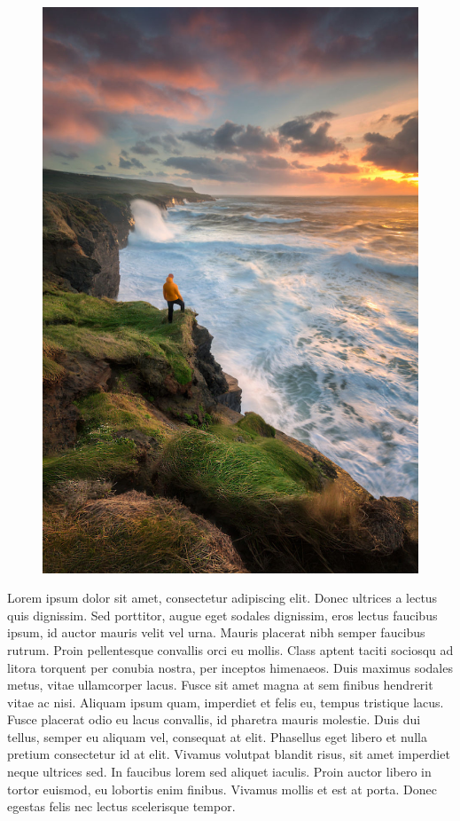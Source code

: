 \documentclass[../main.tex]{subfiles}
\begin{document}
\begin{figure}
  \includegraphics[width=\linewidth]{images/picture.jpg}
\end{figure}

Lorem ipsum dolor sit amet, consectetur adipiscing elit. Donec ultrices a lectus quis dignissim. Sed porttitor, augue eget sodales dignissim, eros lectus faucibus ipsum, id auctor mauris velit vel urna. Mauris placerat nibh semper faucibus rutrum. Proin pellentesque convallis orci eu mollis. Class aptent taciti sociosqu ad litora torquent per conubia nostra, per inceptos himenaeos. Duis maximus sodales metus, vitae ullamcorper lacus. Fusce sit amet magna at sem finibus hendrerit vitae ac nisi. Aliquam ipsum quam, imperdiet et felis eu, tempus tristique lacus. Fusce placerat odio eu lacus convallis, id pharetra mauris molestie. Duis dui tellus, semper eu aliquam vel, consequat at elit. Phasellus eget libero et nulla pretium consectetur id at elit. Vivamus volutpat blandit risus, sit amet imperdiet neque ultrices sed. In faucibus lorem sed aliquet iaculis. Proin auctor libero in tortor euismod, eu lobortis enim finibus. Vivamus mollis et est at porta. Donec egestas felis nec lectus scelerisque tempor.
\end{document}
